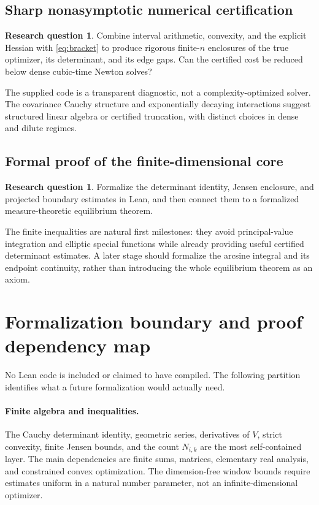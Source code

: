 \documentclass[11pt,a4paper]{article}
\theoremstyle{definition}
\newtheorem{question}[theorem]{Research question}
\theoremstyle{remark}
\begin{document}
\subsection{Sharp nonasymptotic numerical certification}
\begin{question}
Combine interval arithmetic, convexity, and the explicit Hessian with
\eqref{eq:bracket} to produce rigorous finite-$n$ enclosures of the true
optimizer, its determinant, and its edge gaps. Can the certified cost
be reduced below dense cubic-time Newton solves?
\end{question}
The supplied code is a transparent diagnostic, not a complexity-optimized
solver. The covariance Cauchy structure and exponentially decaying
interactions suggest structured linear algebra or certified truncation,
with distinct choices in dense and dilute regimes.

\subsection{Formal proof of the finite-dimensional core}
\begin{question}
Formalize the determinant identity, Jensen enclosure, and projected
boundary estimates in Lean, and then connect them to a formalized
measure-theoretic equilibrium theorem.
\end{question}
The finite inequalities are natural first milestones: they avoid
principal-value integration and elliptic special functions while already
providing useful certified determinant estimates. A later stage should
formalize the arcsine integral and its endpoint continuity, rather than
introducing the whole equilibrium theorem as an axiom.

\section{Formalization boundary and proof dependency map}
\label{sec:formalization}

No Lean code is included or claimed to have compiled. The following
partition identifies what a future formalization would actually need.

\paragraph{Finite algebra and inequalities.}
The Cauchy determinant identity, geometric series, derivatives of $V$,
strict convexity, finite Jensen bounds, and the count $N_{i,k}$ are the
most self-contained layer. The main dependencies are finite sums,
matrices, elementary real analysis, and constrained convex optimization.
The dimension-free window bounds require estimates uniform in a natural
number parameter, not an infinite-dimensional optimizer.
\end{document}
